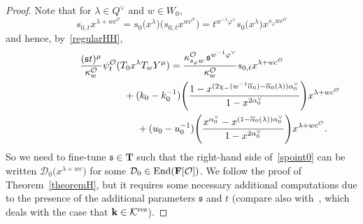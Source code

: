 \begin{proof}
Note that for $\lambda\in Q^\vee$ and $w\in W_0$,
\begin{equation*}
s_{0,t}x^{\lambda+wc^\mathcal{O}}=s_0\bigl(x^\lambda\bigr)\bigl(s_{0,t}x^{wc^\mathcal{O}}\bigr)=t^{w^{-1}\varphi^\vee}s_0\bigl(x^\lambda\bigr)x^{s_\varphi wc^\mathcal{O}}
\end{equation*}
and hence, by~\eqref{regularHH},
\begin{gather}
\frac{(\mathfrak{s}t)^\mu}{\kappa_w^\mathcal{O}}\psi_{t}^\mathcal{O}(T_0x^\lambda T_wY^\mu)=\frac{\kappa_{s_\varphi w}^\mathcal{O}\,\mathfrak{s}^{w^{-1}\varphi^\vee}}{\kappa_w^\mathcal{O}}s_{0,t}x^{\lambda+wc^\mathcal{O}}\nonumber\\
\hphantom{\frac{(\mathfrak{s}t)^\mu}{\kappa_w^\mathcal{O}}\psi_{t}^\mathcal{O}(T_0x^\lambda T_wY^\mu)=}{}
+(k_0-k_0^{-1})\Biggl(\frac{1-x^{(2\chi_-(w^{-1}\overline{\alpha}_0)-\overline{\alpha}_0(\lambda))\alpha_0^\vee}}{1-x^{2\alpha_0^\vee}}\Biggr)x^{\lambda+wc^\mathcal{O}}\nonumber\\
\hphantom{\frac{(\mathfrak{s}t)^\mu}{\kappa_w^\mathcal{O}}\psi_{t}^\mathcal{O}(T_0x^\lambda T_wY^\mu)=}{}
+(u_0-u_0^{-1})\Biggl(\frac{x^{\alpha_0^\vee}-x^{(1-\overline{\alpha}_0(\lambda))\alpha_0^\vee}}{1-x^{2\alpha_0^\vee}}\Biggr)x^{\lambda+wc^\mathcal{O}}.
\label{spoint0}
\end{gather}
So we need to fine-tune $\mathfrak{s}\in\mathbf{T}$ such that the right-hand side of~\eqref{spoint0} can be written
$\mathcal{D}_0\bigl(x^{\lambda+wc}\bigr)$ for
some $\mathcal{D}_0\in\textup{End}(\mathbf{F}[\mathcal{O}])$.
We follow the proof of Theorem~\ref{theoremH}, but it requires some necessary additional computations due to the presence of the additional parameters $\mathfrak{s}$ and $t$ (compare also with~\cite[Section~5]{SSV2}, which deals with the case that $\mathbf{k}\in\mathcal{K}^{{\rm res}}$).


\end{proof}
